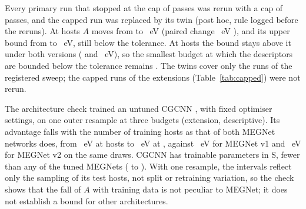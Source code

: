 Every primary run that stopped at the cap of \numCfgTrainingMaxEpochs{} passes was rerun with a cap of
\numCfgSensitivityEpochCapMaxEpochs{} passes, and the capped run was replaced by its twin (post hoc, rule logged
before the reruns). At \numCfgBudgetsHostsItemSix{} hosts $A$ moves from
\numSensCappedPostHocPerBudgetSixHundredFiftyFourPrimaryAMean{} to
\numSensCappedPostHocPerBudgetSixHundredFiftyFourCappedTwinsAMean{}~eV (paired change
\numSensCappedPostHocPerBudgetSixHundredFiftyFourChangeTwinMinusPrimaryAMean{}~eV
\ci{\numSensCappedPostHocPerBudgetSixHundredFiftyFourChangeTwinMinusPrimaryACiLo{}}{\numSensCappedPostHocPerBudgetSixHundredFiftyFourChangeTwinMinusPrimaryACiHi{}}),
and its upper bound from \numSensCappedPostHocPerBudgetSixHundredFiftyFourPrimaryAUpperOneSided{} to
\numSensCappedPostHocPerBudgetSixHundredFiftyFourCappedTwinsAUpperOneSided{}~eV, still below the tolerance. At
\numCfgBudgetsHostsItemFive{} hosts the bound stays above it under both versions
(\numSensCappedPostHocPerBudgetFourHundredPrimaryAUpperOneSided{} and
\numSensCappedPostHocPerBudgetFourHundredCappedTwinsAUpperOneSided{}~eV), so the smallest budget at which the
descriptors are bounded below the tolerance remains \numCfgBudgetsHostsItemSix{}. The twins cover only the runs of
the registered sweep; the capped runs of the extensions (Table~\ref{tab:capped}) were not rerun.

The architecture check trained an untuned CGCNN \citep{Xie2018crystal}, with fixed optimiser settings, on one outer
resample at three budgets (extension, descriptive). Its advantage falls with the number of training hosts as that of
both MEGNet networks does, from \numSensCgcnnTableCgcnnFiftyAPoint{}~eV at \numCfgBudgetsHostsItemTwo{} hosts to
\numSensCgcnnTableCgcnnSixHundredFiftyFourAPoint{}~eV
\ci{\numSensCgcnnTableCgcnnSixHundredFiftyFourACiNinetyFiveItemOne{}}{\numSensCgcnnTableCgcnnSixHundredFiftyFourACiNinetyFiveItemTwo{}}
at \numCfgBudgetsHostsItemSix{}, against \numSensCgcnnTableMegnetVOneSixHundredFiftyFourAPoint{}~eV for MEGNet v1
and \numSensCgcnnTableMegnetVTwoSixHundredFiftyFourAPoint{}~eV for MEGNet v2 on the same draws. CGCNN has
\numSensCgcnnParameterCountsCgcnnCgcnnSSixHundredFiftyFour{} trainable parameters in S, fewer than any of the tuned MEGNets
(\numSensCgcnnParameterCountsMegnetVTwoSTwoHundred{} to \numSensCgcnnParameterCountsMegnetVOneSTwoHundred{}). With one resample, the intervals reflect only the sampling of its test hosts, not split or retraining
variation, so the check shows that the fall of $A$ with training data is not peculiar to MEGNet; it does not
establish a bound for other architectures.

